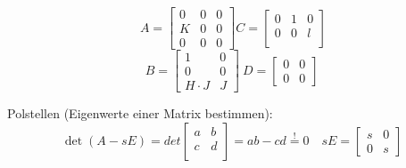 \begin{mdframed}[style=exercise]
	\[
		\ A = \begin{bmatrix}
			0 & 0 & 0 \\
			K & 0 & 0 \\
			0 & 0 & 0
		\end{bmatrix}
		C = \begin{bmatrix}
			0 & 1 & 0 \\ 
			0 & 0 & l \\
		\end{bmatrix}\]
	\[B = \begin{bmatrix}
			1         & 0 \\
			0         & 0 \\
			H\cdot{}J & J
		\end{bmatrix} \
		D = \begin{bmatrix}
			0 & 0 \\
			0 & 0
		\end{bmatrix}
	\]

	Polstellen (Eigenwerte einer Matrix bestimmen):
    \[
        \operatorname{det}(A - sE)= det
		\begin{bmatrix}
			a & b \\
			c & d \\
		\end{bmatrix} = ab - cd \overset{!}{=} 0 \quad sE =\begin{bmatrix}
			s & 0 \\
			0 & s
		\end{bmatrix}
    \]
\end{mdframed}






